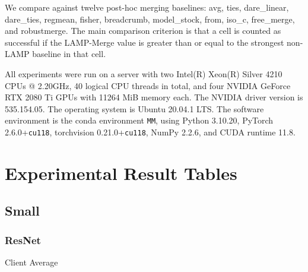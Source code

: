\documentclass[letterpaper]{article}
\begin{document}
We compare against twelve post-hoc merging baselines: avg, ties, dare\_linear, dare\_ties, regmean, fisher, breadcrumb, model\_stock, from, iso\_c, free\_merge, and robustmerge. The main comparison criterion is that a cell is counted as successful if the LAMP-Merge value is greater than or equal to the strongest non-LAMP baseline in that cell.


All experiments were run on a server with two Intel(R) Xeon(R) Silver 4210 CPUs @ 2.20GHz, 40 logical CPU threads in total, and four NVIDIA GeForce RTX 2080 Ti GPUs with 11264 MiB memory each. The NVIDIA driver version is 535.154.05. The operating system is Ubuntu 20.04.1 LTS. The software environment is the conda environment \texttt{MM}, using Python 3.10.20, PyTorch 2.6.0+\texttt{cu118}, torchvision 0.21.0+\texttt{cu118}, NumPy 2.2.6, and CUDA runtime 11.8.


\section{Experimental Result Tables}

\subsection{Small}

\subsubsection{ResNet}

Client Average
\end{document}
